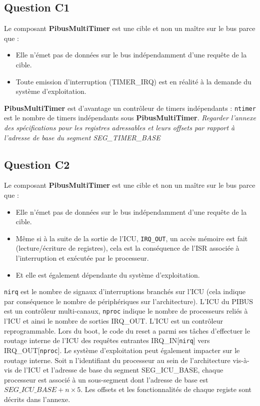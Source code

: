 \documentclass[10pt]{article}
\begin{document}
\subsection{Question C1}
Le composant {\bf PibusMultiTimer} est une cible et non un maître sur le bus
parce que :
\begin{itemize}
  \item Elle n'émet pas de données sur le bus indépendamment d'une requête
  de la cible.
  \item Toute emission d'interruption (TIMER\_IRQ) est en réalité à la demande
  du système d'exploitation.
\end{itemize}
{\bf PibusMultiTimer} est d'avantage un contrôleur de timers indépendants :
\texttt{ntimer} est le nombre de timers indépendants sous {\bf PibusMultiTimer}.
\newline
{\it Regarder l'annexe des spécifications pour les registres adressables et
leurs offsets par rapport à l'adresse de base du segment SEG\_TIMER\_BASE}

\subsection{Question C2}
Le composant {\bf PibusMultiTimer} est une cible et non un maître sur le bus
parce que :
\begin{itemize}
  \item Elle n'émet pas de données sur le bus indépendamment d'une requête
  de la cible.
  \item Même si à la suite de la sortie de l'ICU, \texttt{IRQ\_OUT}, un accès
  mémoire est fait (lecture/écriture de registres), cela est la conséquence
  de l'ISR associée à l'interruption et exécutée par le processeur.
  \item Et elle est également dépendante du système d'exploitation.
\end{itemize}
\texttt{nirq} est le nombre de signaux d'interruptions branchés sur l'ICU (cela
indique par conséquence le nombre de périphériques sur l'architecture).
\newline
L'ICU du PIBUS est un contrôleur multi-canaux, \texttt{nproc} indique le nombre
de processeurs reliés à l'ICU et ainsi le nombre de sorties IRQ\_OUT.
\newline
L'ICU est un contrôleur reprogrammable. Lors du boot, le code du reset a parmi
ses tâches d'effectuer le routage interne de l'ICU des requêtes entrantes
IRQ\_IN[\texttt{nirq}] vers IRQ\_OUT[\texttt{nproc}]. Le système d'exploitation
peut également impacter sur le routage interne.
\newline
Soit n l'identifiant du processeur au sein de l'architecture vis-à-vis de l'ICU
et l'adresse de base du segment SEG\_ICU\_BASE, chaque processeur est associé à
un sous-segment dont l'adresse de base est $SEG\_ICU\_BASE + n \times 5$. Les
offsets et les fonctionnalités de chaque registe sont décrits dans l'annexe.
\end{document}
